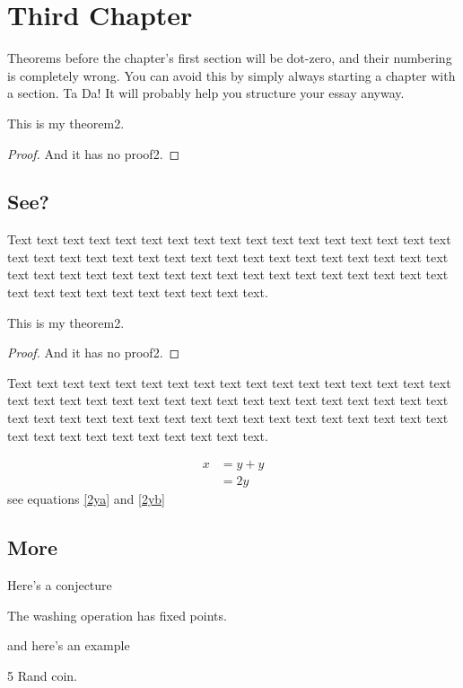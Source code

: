 \chapter{Third Chapter}

Theorems before the chapter's first section will be dot-zero, 
and their numbering is completely wrong. You can avoid this
by simply always starting a chapter with a section. Ta Da! 
It will probably help you structure your essay anyway. 

\begin{thm}[My Theorem2]
This is my theorem2.
\end{thm}
\begin{proof}
And it has no proof2.
\end{proof}

\section{See?}

Text text text text text text text text text text text text text text
text text text text text text text text text text text text text text
text text text text text text text text text text text text text text
text text text text text text text text text text text text text text
text text text text text.

\begin{thm}[My Theorem2]
This is my theorem2.
\end{thm}
\begin{proof}
And it has no proof2.
\end{proof}

Text text text text text text text text text text text text text text
text text text text text text text text text text text text text text
text text text text text text text text text text text text text text
text text text text text text text text text text text text text text
text text text text text.

\begin{align} %
\label{2ya}
x & = y + y\\
\label{2yb}
& = 2y
\end{align}
see equations \ref{2ya} and \ref{2yb}

\section{More}

Here's a conjecture
\begin{conj}
The washing operation has fixed points.
\end{conj}

and here's an example

\begin{exa}
5 Rand coin.
\end{exa}


